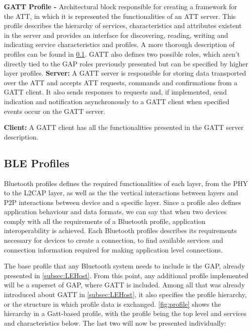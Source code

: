 \textbf{\ac{GATT} Profile -} Architectural block responsible for creating a framework for the \ac{ATT}, in which it is represented the functionalities of an \ac{ATT} server. This profile describes the hierarchy of services, characteristics and attributes existent in the server and provides an interface for discovering, reading, writing and indicating service characteristics and profiles. A more thorough description of profiles can be found in \ref{subsec:BLEProfile}. \ac{GATT} also defines two possible roles, which aren't directly tied to the \ac{GAP} roles previously presented but can be specified by higher layer profiles.
\tab \textbf{Server:} A \ac{GATT} server is responsible for storing data transported over the \ac{ATT} and accepts \ac{ATT} requests, commands and confirmations from a \ac{GATT} client. It also sends responses to requests and, if implemented, send indication and notification asynchronously to a \ac{GATT} client when specified events occur on the \ac{GATT} server.

\tab \textbf{Client:} A \ac{GATT} client has all the functionalities presented in the \ac{GATT} server description.

\subsection{\ac{BLE} Profiles}
\label{subsec:BLEProfile}


Bluetooth profiles defines the required functionalities of each layer, from the \ac{PHY} to the \ac{L2CAP} layer, as well as the the vertical interactions between layers and \ac{P2P} interactions between device and a specific layer. Since a profile also defines application behaviour and data formats, we can say that when two devices comply with all the requirements of a Bluetooth profile, application interoperability is achieved. Each Bluetooth profiles describes its requirements necessary for devices to create a connection, to find available services and connection information required for making application level connections.

The base profile that any Bluetooth system needs to include is the \ac{GAP}, already presented in \ref{subsec:LEHost}. From this point, any additional profile implemented will be a superset of \ac{GAP}, where \ac{GATT} is included. Among all that was already introduced about \ac{GATT} in \ref{subsec:LEHost}, it also specifies the profile hierarchy, or the structure in which profile data is exchanged.  \ref{fig:profile} shows the hierarchy in a Gatt-based profile, with the profile being the top level and services and characteristics below. The last two will now be presented individually:

